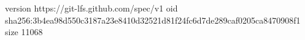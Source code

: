 version https://git-lfs.github.com/spec/v1
oid sha256:3b4ea98d550c3187a23e8410d32521d81f24fc6d7de289caf0205ca8470908f1
size 11068
